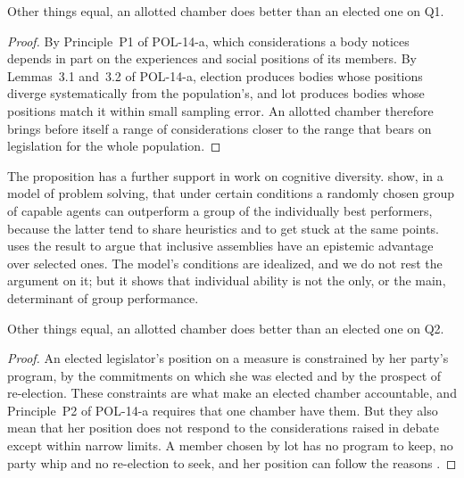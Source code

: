 \documentclass{situationist-preprint}
\begin{document}
\begin{proposition}\label{p:breadth}
Other things equal, an allotted chamber does better than an elected one on Q1.
\end{proposition}

\begin{proof}
By Principle~P1 of POL-14-a, which considerations a body notices depends in part on the experiences and social positions of its members. By Lemmas~3.1 and~3.2 of POL-14-a, election produces bodies whose positions diverge systematically from the population's, and lot produces bodies whose positions match it within small sampling error. An allotted chamber therefore brings before itself a range of considerations closer to the range that bears on legislation for the whole population.
\end{proof}

The proposition has a further support in work on cognitive diversity. \citet{HongPage2004} show, in a model of problem solving, that under certain conditions a randomly chosen group of capable agents can outperform a group of the individually best performers, because the latter tend to share heuristics and to get stuck at the same points. \citet{Landemore2013} uses the result to argue that inclusive assemblies have an epistemic advantage over selected ones. The model's conditions are idealized, and we do not rest the argument on it; but it shows that individual ability is not the only, or the main, determinant of group performance.

\begin{proposition}\label{p:responsiveness}
Other things equal, an allotted chamber does better than an elected one on Q2.
\end{proposition}

\begin{proof}
An elected legislator's position on a measure is constrained by her party's program, by the commitments on which she was elected and by the prospect of re-election. These constraints are what make an elected chamber accountable, and Principle~P2 of POL-14-a requires that one chamber have them. But they also mean that her position does not respond to the considerations raised in debate except within narrow limits. A member chosen by lot has no program to keep, no party whip and no re-election to seek, and her position can follow the reasons \citep{Guerrero2014}.
\end{proof}
\end{document}
